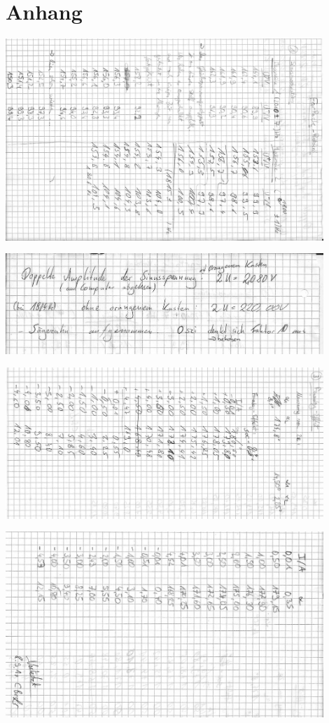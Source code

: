 \section{Anhang}

\begin{appendix}
 

\includegraphics[width=0.9\textwidth]{Bilder/protokoll_1.jpeg}

\includegraphics[width=0.9\textwidth]{Bilder/protokoll_2.jpeg}

\includegraphics[width=0.9\textwidth]{Bilder/protokoll_3.jpeg}

\includegraphics[width=0.9\textwidth]{Bilder/protokoll_4.jpeg}
\end{appendix}
